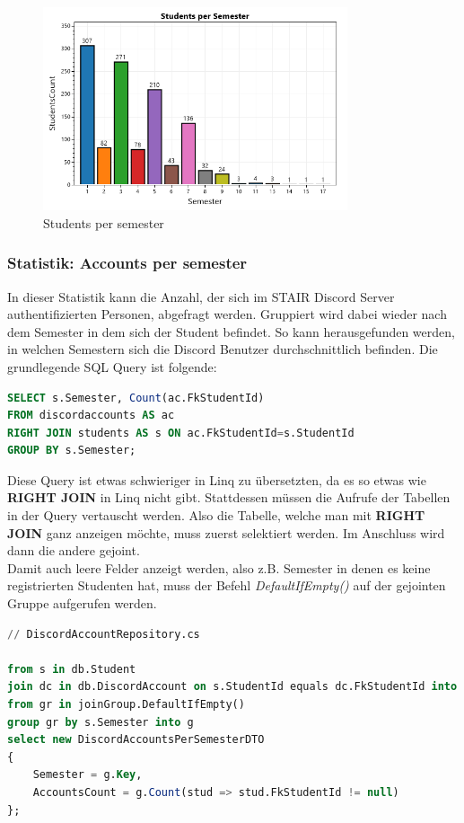 \documentclass[a4paper, table]{article}
\begin{document}
\begin{figure}[h]
    \centering
    \includegraphics[width=0.8\textwidth]{img/studentsPerSemester.png}
    \caption{Students per semester}
    \label{fig:students-per-semester}
\end{figure}

\newpage
\subsubsection*{Statistik: Accounts per semester}
In dieser Statistik kann die Anzahl, der sich im STAIR Discord Server authentifizierten Personen, abgefragt werden.
Gruppiert wird dabei wieder nach dem Semester in dem sich der Student befindet.
So kann herausgefunden werden, in welchen Semestern sich die Discord Benutzer durchschnittlich befinden.
Die grundlegende SQL Query ist folgende:

\begin{lstlisting}[language=SQL]
SELECT s.Semester, Count(ac.FkStudentId)
FROM discordaccounts AS ac
RIGHT JOIN students AS s ON ac.FkStudentId=s.StudentId
GROUP BY s.Semester;
\end{lstlisting}

Diese Query ist etwas schwieriger in Linq zu übersetzten, da es so etwas wie \textbf{RIGHT JOIN} in Linq nicht gibt.
Stattdessen müssen die Aufrufe der Tabellen in der Query vertauscht werden.
Also die Tabelle, welche man mit \textbf{RIGHT JOIN} ganz anzeigen möchte, muss zuerst selektiert werden.
Im Anschluss wird dann die andere gejoint.\\
Damit auch leere Felder anzeigt werden, also z.B. Semester in denen es keine registrierten Studenten hat, 
muss der Befehl \textit{DefaultIfEmpty()} auf der gejointen Gruppe aufgerufen werden.

\begin{lstlisting}[language=SQL]
// DiscordAccountRepository.cs

from s in db.Student
join dc in db.DiscordAccount on s.StudentId equals dc.FkStudentId into joinGroup
from gr in joinGroup.DefaultIfEmpty()
group gr by s.Semester into g
select new DiscordAccountsPerSemesterDTO
{
    Semester = g.Key,
    AccountsCount = g.Count(stud => stud.FkStudentId != null)
};
\end{lstlisting}
\end{document}
